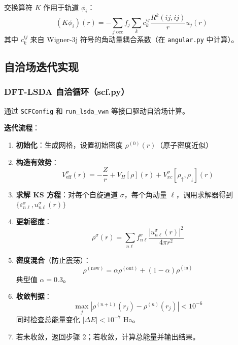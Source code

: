 \documentclass[12pt,a4paper]{article}
\begin{document}
交换算符 $K$ 作用于轨道 $\phi_i$：
\begin{equation}
    (K \phi_i)(r) = -\sum_{j \text{ occ}} f_j \sum_k c_k^{ij} \frac{R^k(ij,ij)}{r} u_j(r)
\end{equation}
其中 $c_k^{ij}$ 来自 Wigner-3j 符号的角动量耦合系数（在 \texttt{angular.py} 中计算）。

\subsection{自洽场迭代实现}

\subsubsection{DFT-LSDA 自洽循环（scf.py）}

通过 \texttt{SCFConfig} 和 \texttt{run\_lsda\_vwn} 等接口驱动自洽场计算。

\textbf{迭代流程}：
\begin{enumerate}
    \item \textbf{初始化}：生成网格，设置初始密度 $\rho^{(0)}(r)$（原子密度近似）
    \item \textbf{构造有效势}：
          \begin{equation}
              V_{\text{eff}}^\sigma(r) = -\frac{Z}{r} + V_H[\rho](r) + V_{xc}^\sigma[\rho_\uparrow, \rho_\downarrow](r)
          \end{equation}
    \item \textbf{求解 KS 方程}：对每个自旋通道 $\sigma$，每个角动量 $\ell$，调用求解器得到 $\{\varepsilon_{n\ell}^\sigma, u_{n\ell}^\sigma(r)\}$
    \item \textbf{更新密度}：
          \begin{equation}
              \rho^\sigma(r) = \sum_{n\ell} f_{n\ell}^\sigma \frac{|u_{n\ell}^\sigma(r)|^2}{4\pi r^2}
          \end{equation}
    \item \textbf{密度混合}（防止震荡）：
          \begin{equation}
              \rho^{(\text{new})} = \alpha \rho^{(\text{out})} + (1-\alpha) \rho^{(\text{in})}
          \end{equation}
          典型值 $\alpha = 0.3$。
    \item \textbf{收敛判据}：
          \begin{equation}
              \max_j |\rho^{(n+1)}(r_j) - \rho^{(n)}(r_j)| < 10^{-6}
          \end{equation}
          同时检查总能量变化 $|\Delta E| < 10^{-7}$ Ha。
    \item 若未收敛，返回步骤 2；若收敛，计算总能量并输出结果。
\end{enumerate}
\end{document}
